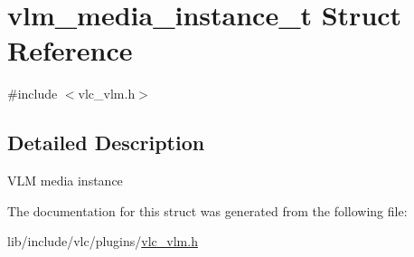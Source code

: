 \hypertarget{structvlm__media__instance__t}{}\section{vlm\+\_\+media\+\_\+instance\+\_\+t Struct Reference}
\label{structvlm__media__instance__t}


{\ttfamily \#include $<$vlc\+\_\+vlm.\+h$>$}



\subsection{Detailed Description}
V\+LM media instance 

The documentation for this struct was generated from the following file\+:\begin{DoxyCompactItemize}
\item 
lib/include/vlc/plugins/\hyperlink{vlc__vlm_8h}{vlc\+\_\+vlm.\+h}\end{DoxyCompactItemize}
